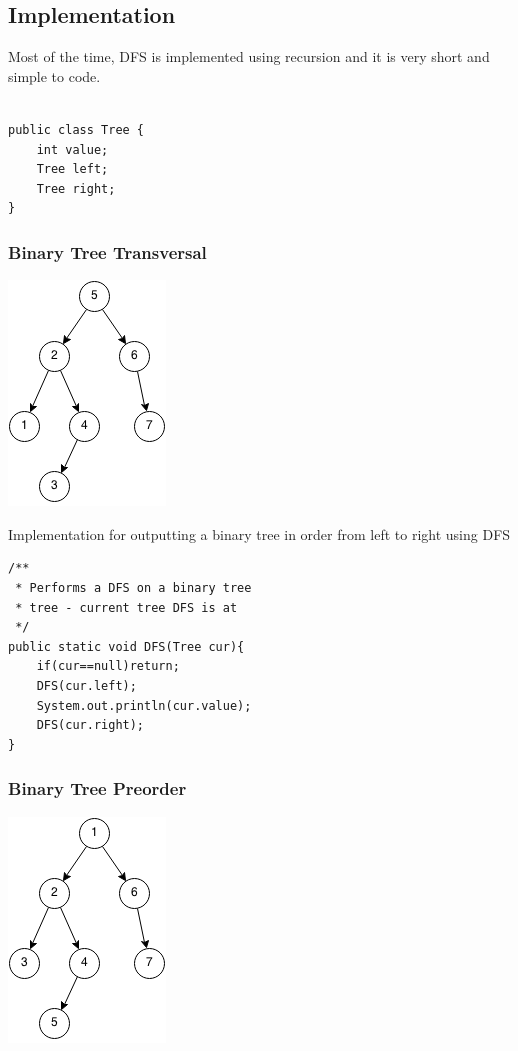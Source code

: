 \documentclass[11pt,oneside]{book}
\makeatletter
\def\maxwidth#1{\ifdim\Gin@nat@width>#1 #1\else\Gin@nat@width\fi}
\makeatother
\begin{document}
\subsection{Implementation}

Most of the time, DFS is implemented using recursion and it is very short and simple to code.

\begin{lstlisting}

public class Tree {
    int value;
    Tree left;
    Tree right;
}
\end{lstlisting}

\subsubsection{Binary Tree Transversal}

\includegraphics[width=\maxwidth{\textwidth}]{dfs.png}

Implementation for outputting a binary tree in order from left to right using DFS

\begin{lstlisting}
/**
 * Performs a DFS on a binary tree
 * tree - current tree DFS is at
 */
public static void DFS(Tree cur){
    if(cur==null)return;
    DFS(cur.left);
    System.out.println(cur.value);
    DFS(cur.right);
}
\end{lstlisting}

\subsubsection{Binary Tree Preorder}

\includegraphics[width=\maxwidth{\textwidth}]{dfs-preorder.png}
\end{document}
